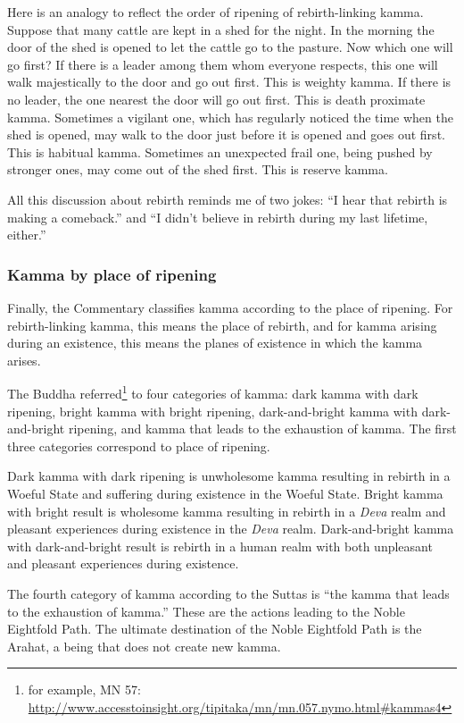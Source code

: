 Here is an analogy to reflect the order of ripening of rebirth-linking kamma. Suppose that many cattle are kept in a shed for the night. In the morning the door of the shed is opened to let the cattle go to the pasture. Now which one will go first? If there is a leader among them whom everyone respects, this one will walk majestically to the door and go out first. This is weighty kamma. If there is no leader, the one nearest the door will go out first. This is death proximate kamma. Sometimes a vigilant one, which has regularly noticed the time when the shed is opened, may walk to the door just before it is opened and goes out first. This is habitual kamma. Sometimes an unexpected frail one, being pushed by stronger ones, may come out of the shed first. This is reserve kamma.

All this discussion about rebirth reminds me of two jokes: “I hear that rebirth is making a comeback.” and “I didn’t believe in rebirth during my last lifetime, either.”

\pagebreak

\subsubsection*{Kamma by place of ripening}

Finally, the Commentary classifies kamma according to the place of ripening. For rebirth-linking kamma, this means the place of rebirth, and for kamma arising during an existence, this means the planes of existence in which the kamma arises.

The Buddha referred\footnote{for example, MN 57: \url{http://www.accesstoinsight.org/tipitaka/mn/mn.057.nymo.html\#kammas4}} to four categories of kamma: dark kamma with dark ripening, bright kamma with bright ripening, dark-and-bright kamma with dark-and-bright ripening, and kamma that leads to the exhaustion of kamma. The first three categories correspond to place of ripening.

Dark kamma with dark ripening is unwholesome kamma resulting in rebirth in a Woeful State and suffering during existence in the Woeful State. Bright kamma with bright result is wholesome kamma resulting in rebirth in a \textit{Deva} realm and pleasant experiences during existence in the \textit{Deva} realm. Dark-and-bright kamma with dark-and-bright result is rebirth in a human realm with both unpleasant and pleasant experiences during existence. 

The fourth category of kamma according to the Suttas is “the kamma that leads to the exhaustion of kamma.” These are the actions leading to the Noble Eightfold Path. The ultimate destination of the Noble Eightfold Path is the Arahat, a being that does not create new kamma.

